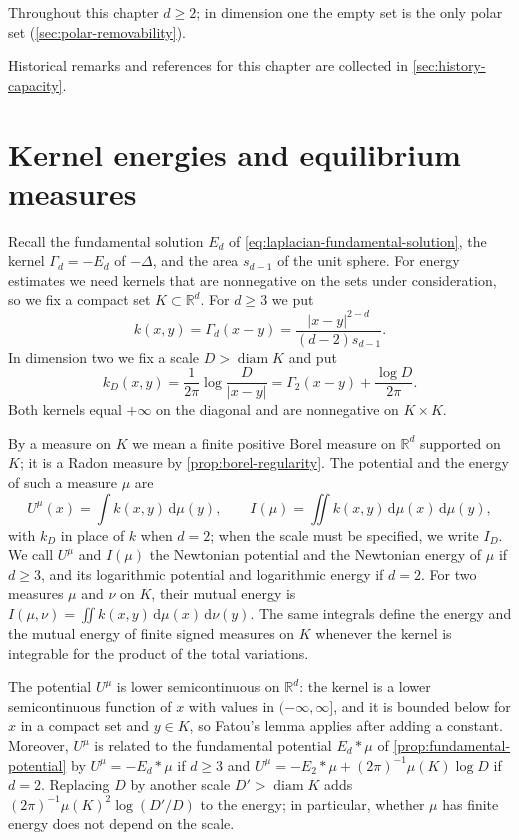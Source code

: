 Throughout this chapter $d\geq2$; in dimension one the empty set is the only polar set (\cref{sec:polar-removability}).

Historical remarks and references for this chapter are collected in \cref{sec:history-capacity}.

\section{Kernel energies and equilibrium measures}
\label{sec:kernel-energy}
Recall the fundamental solution $E_d$ of \eqref{eq:laplacian-fundamental-solution}, the kernel $\Gamma_d=-E_d$ of $-\Delta$, and the area $s_{d-1}$ of the unit sphere. For energy estimates we need kernels that are nonnegative on the sets under consideration, so we fix a compact set $K\subset\mathbb R^d$. For $d\geq3$ we put
\[
 k(x,y)=\Gamma_d(x-y)=\frac{|x-y|^{2-d}}{(d-2)s_{d-1}}.
\]
In dimension two we fix a scale $D>\operatorname{diam}K$ and put
\[
 k_D(x,y)=\frac{1}{2\pi}\log\frac{D}{|x-y|}=\Gamma_2(x-y)+\frac{\log D}{2\pi}.
\]
Both kernels equal $+\infty$ on the diagonal and are nonnegative on $K\times K$.

By a measure on $K$ we mean a finite positive Borel measure on $\mathbb R^d$ supported on $K$; it is a Radon measure by \cref{prop:borel-regularity}. The potential and the energy of such a measure $\mu$ are
\[
 U^\mu(x)=\int k(x,y)\,\mathrm d\mu(y),\qquad I(\mu)=\iint k(x,y)\,\mathrm d\mu(x)\,\mathrm d\mu(y),
\]
with $k_D$ in place of $k$ when $d=2$; when the scale must be specified, we write $I_D$. We call $U^\mu$ and $I(\mu)$ the Newtonian potential and the Newtonian energy of $\mu$ if $d\geq3$, and its logarithmic potential and logarithmic energy if $d=2$. For two measures $\mu$ and $\nu$ on $K$, their mutual energy is $I(\mu,\nu)=\iint k(x,y)\,\mathrm d\mu(x)\,\mathrm d\nu(y)$. The same integrals define the energy and the mutual energy of finite signed measures on $K$ whenever the kernel is integrable for the product of the total variations.

The potential $U^\mu$ is lower semicontinuous on $\mathbb R^d$: the kernel is a lower semicontinuous function of $x$ with values in $(-\infty,\infty]$, and it is bounded below for $x$ in a compact set and $y\in K$, so Fatou's lemma applies after adding a constant. Moreover, $U^\mu$ is related to the fundamental potential $E_d*\mu$ of \cref{prop:fundamental-potential} by $U^\mu=-E_d*\mu$ if $d\geq3$ and $U^\mu=-E_2*\mu+(2\pi)^{-1}\mu(K)\log D$ if $d=2$. Replacing $D$ by another scale $D'>\operatorname{diam}K$ adds $(2\pi)^{-1}\mu(K)^2\log(D'/D)$ to the energy; in particular, whether $\mu$ has finite energy does not depend on the scale.

